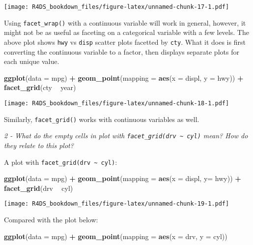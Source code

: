 \documentclass[]{article}
\newenvironment{Shaded}{\begin{snugshade}}{\end{snugshade}}
\newcommand{\KeywordTok}[1]{\textcolor[rgb]{0.13,0.29,0.53}{\textbf{#1}}}
\newcommand{\DataTypeTok}[1]{\textcolor[rgb]{0.13,0.29,0.53}{#1}}
\newcommand{\StringTok}[1]{\textcolor[rgb]{0.31,0.60,0.02}{#1}}
\newcommand{\OperatorTok}[1]{\textcolor[rgb]{0.81,0.36,0.00}{\textbf{#1}}}
\newcommand{\NormalTok}[1]{#1}
\theoremstyle{definition}
\theoremstyle{definition}
\theoremstyle{definition}
\theoremstyle{remark}
\begin{document}
\texttt{[image: R4DS\_bookdown\_files/figure-latex/unnamed-chunk-17-1.pdf]}

Using \texttt{facet\_wrap()} with a continuous variable will work in
general, however, it might not be as useful as faceting on a categorical
variable with a few levels. The above plot shows \texttt{hwy} vs
\texttt{disp} scatter plots facetted by \texttt{cty}. What it does is
first converting the continuous variable to a factor, then displays
separate plots for each unique value.

\begin{Shaded}
\begin{Highlighting}[]
\KeywordTok{ggplot}\NormalTok{(}\DataTypeTok{data =}\NormalTok{ mpg) }\OperatorTok{+}\StringTok{ }
\StringTok{  }\KeywordTok{geom_point}\NormalTok{(}\DataTypeTok{mapping =} \KeywordTok{aes}\NormalTok{(}\DataTypeTok{x =}\NormalTok{ displ, }\DataTypeTok{y =}\NormalTok{ hwy)) }\OperatorTok{+}\StringTok{ }
\StringTok{  }\KeywordTok{facet_grid}\NormalTok{(cty }\OperatorTok{~}\StringTok{ }\NormalTok{year)}
\end{Highlighting}
\end{Shaded}

\texttt{[image: R4DS\_bookdown\_files/figure-latex/unnamed-chunk-18-1.pdf]}

Similarly, \texttt{facet\_grid()} works with continuous variables as
well.

\emph{2 - What do the empty cells in plot with
\texttt{facet\_grid(drv\ \textasciitilde{}\ cyl)} mean? How do they
relate to this plot?}

A plot with \texttt{facet\_grid(drv\ \textasciitilde{}\ cyl)}:

\begin{Shaded}
\begin{Highlighting}[]
\KeywordTok{ggplot}\NormalTok{(}\DataTypeTok{data =}\NormalTok{ mpg) }\OperatorTok{+}
\StringTok{  }\KeywordTok{geom_point}\NormalTok{(}\DataTypeTok{mapping =} \KeywordTok{aes}\NormalTok{(}\DataTypeTok{x =}\NormalTok{ displ, }\DataTypeTok{y=}\NormalTok{ hwy)) }\OperatorTok{+}\StringTok{ }
\StringTok{  }\KeywordTok{facet_grid}\NormalTok{(drv }\OperatorTok{~}\StringTok{ }\NormalTok{cyl)}
\end{Highlighting}
\end{Shaded}

\texttt{[image: R4DS\_bookdown\_files/figure-latex/unnamed-chunk-19-1.pdf]}

Compared with the plot below:

\begin{Shaded}
\begin{Highlighting}[]
\KeywordTok{ggplot}\NormalTok{(}\DataTypeTok{data =}\NormalTok{ mpg) }\OperatorTok{+}\StringTok{ }
\StringTok{  }\KeywordTok{geom_point}\NormalTok{(}\DataTypeTok{mapping =} \KeywordTok{aes}\NormalTok{(}\DataTypeTok{x =}\NormalTok{ drv, }\DataTypeTok{y =}\NormalTok{ cyl))}
\end{Highlighting}
\end{Shaded}
\end{document}
